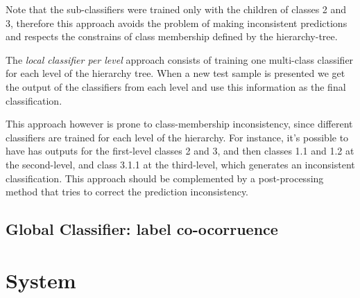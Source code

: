 \documentclass[11pt]{article}
\begin{document}
Note that the sub-classifiers were trained only with the children of classes 2 and 3, therefore
this approach avoids the problem of making inconsistent predictions and respects the constrains
of class membership defined by the hierarchy-tree.


The \textit{local classifier per level} approach consists of training one multi-class classifier
for each level of the hierarchy tree. When a new test sample is presented we get the output of the
classifiers from each level and use this information as the final classification.

This approach however is prone to class-membership inconsistency, since different classifiers are
trained for each level of the hierarchy. For instance, it's possible to have has outputs for the
first-level classes 2 and 3, and then classes 1.1 and 1.2 at the second-level, and class 3.1.1
at the third-level, which generates an inconsistent classification. This approach should
be complemented by a post-processing method that tries to correct the prediction inconsistency.



\begin{comment}
In essence, in this top-down approach, for each new example in the test set, the system first
predicts its first-level (most generic) class, then it uses that predicted class to narrow
the choices of classes to be predicted at the second level (the only valid candidate
second-level classes are the children of the class predicted at the first level), and so on,
recursively, until the most specific prediction is made.

This local approach has some disadvantages, a disadvantage of the top-down class-prediction
approach (which is shared by all the three types of local classifiers discussed next) is that an
error at a certain class level is going to be propagated downwards the hierarchy, unless some
procedure for avoiding this problem is used
\end{comment}



\subsection{Global Classifier: label co-ocorruence}



\section{System}
\end{document}
